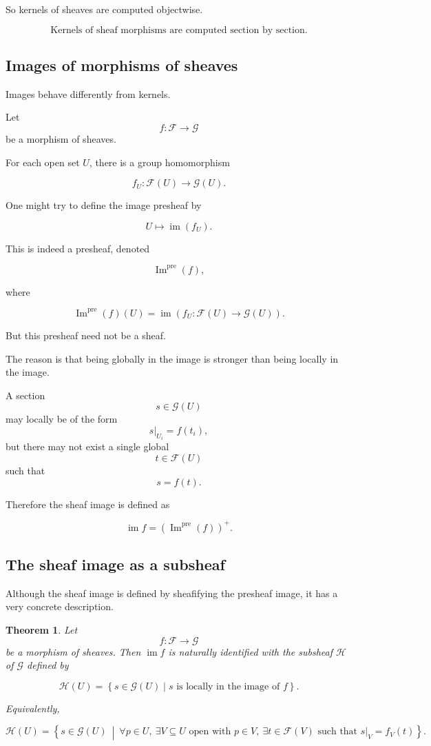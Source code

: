 \documentclass[12pt,a4paper]{article}
\newtheorem{theorem}{Theorem}[section]
\newcommand{\im}{\operatorname{im}}
\begin{document}
So kernels of sheaves are computed objectwise.

\[
\boxed{
	\text{Kernels of sheaf morphisms are computed section by section.}
}
\]

\subsection{Images of morphisms of sheaves}

Images behave differently from kernels.

Let
\[
f:\mathcal F \longrightarrow \mathcal G
\]
be a morphism of sheaves.

For each open set $U$, there is a group homomorphism

\[
f_U:\mathcal F(U)\to\mathcal G(U).
\]

One might try to define the image presheaf by

\[
U \longmapsto \im(f_U).
\]

This is indeed a presheaf, denoted

\[
\operatorname{Im}^{\operatorname{pre}}(f),
\]

where

\[
\operatorname{Im}^{\operatorname{pre}}(f)(U)
=
\im
\left(
f_U:\mathcal F(U)\to\mathcal G(U)
\right).
\]

But this presheaf need not be a sheaf.

The reason is that being globally in the image is stronger than being locally
in the image.

A section
\[
s \in \mathcal G(U)
\]
may locally be of the form
\[
s|_{U_i}=f(t_i),
\]
but there may not exist a single global
\[
t \in \mathcal F(U)
\]
such that
\[
s=f(t).
\]

Therefore the sheaf image is defined as

\[
\im f
=
\left(
\operatorname{Im}^{\operatorname{pre}}(f)
\right)^+.
\]

\subsection{The sheaf image as a subsheaf}

Although the sheaf image is defined by sheafifying the presheaf image, it has
a very concrete description.

\begin{theorem}
	Let
	\[
	f:\mathcal F \longrightarrow \mathcal G
	\]
	be a morphism of sheaves.
	Then $\im f$ is naturally identified with the subsheaf $\mathcal H$ of
	$\mathcal G$ defined by
	
	\[
	\mathcal H(U)
	=
	\left\{
	s \in \mathcal G(U)
	\mid
	s \text{ is locally in the image of } f
	\right\}.
	\]
	
	Equivalently,
	
	\[
	\mathcal H(U)
	=
	\left\{
	s \in \mathcal G(U)
	\ \middle|\
	\forall p \in U,\ \exists V \subseteq U \text{ open with } p \in V,
	\ \exists t \in \mathcal F(V)
	\text{ such that } s|_V=f_V(t)
	\right\}.
	\]
\end{theorem}
\end{document}
